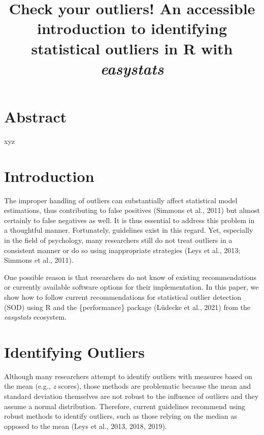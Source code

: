 \documentclass[
]{article}
\title{Check your outliers! An accessible introduction to identifying statistical outliers in R with \emph{easystats}}
\author{}
\date{\vspace{-2.5em}}
\begin{document}
\maketitle

\hypertarget{abstract}{%
\section{Abstract}\label{abstract}}

xyz

\hypertarget{introduction}{%
\section{Introduction}\label{introduction}}

The improper handling of outliers can substantially affect statistical model estimations, thus contributing to false positives (Simmons et al., 2011) but almost certainly to false negatives as well. It is thus essential to address this problem in a thoughtful manner. Fortunately, guidelines exist in this regard. Yet, especially in the field of psychology, many researchers still do not treat outliers in a consistent manner or do so using inappropriate strategies (Leys et al., 2013; Simmons et al., 2011).

One possible reason is that researchers do not know of existing recommendations or currently available software options for their implementation. In this paper, we show how to follow current recommendations for statistical outlier detection (SOD) using R and the \{performance\} package (Lüdecke et al., 2021) from the \emph{easystats} ecosystem.

\hypertarget{identifying-outliers}{%
\section{Identifying Outliers}\label{identifying-outliers}}

Although many researchers attempt to identify outliers with measures based on the mean (e.g., \emph{z} scores), those methods are problematic because the mean and standard deviation themselves are not robust to the influence of outliers and they assume a normal distribution. Therefore, current guidelines recommend using robust methods to identify outliers, such as those relying on the median as opposed to the mean (Leys et al., 2013, 2018, 2019).
\end{document}
